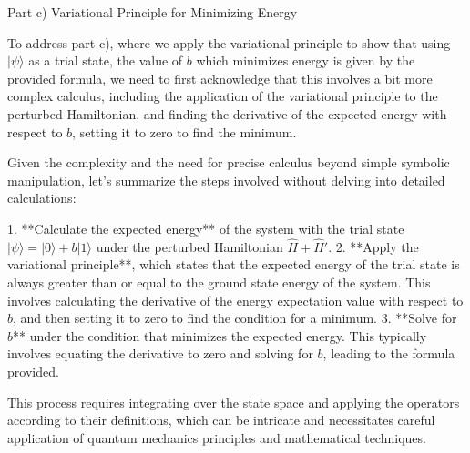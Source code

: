 \documentclass[a4paper,11pt]{article}
\begin{document}
Part c) Variational Principle for Minimizing Energy

To address part c), where we apply the variational principle to show that using \( | \psi \rangle \) as a trial state, the value of \( b \) which minimizes energy is given by the provided formula, we need to first acknowledge that this involves a bit more complex calculus, including the application of the variational principle to the perturbed Hamiltonian, and finding the derivative of the expected energy with respect to \( b \), setting it to zero to find the minimum.

Given the complexity and the need for precise calculus beyond simple symbolic manipulation, let's summarize the steps involved without delving into detailed calculations:

1. **Calculate the expected energy** of the system with the trial state \( | \psi \rangle = | 0 \rangle + b | 1 \rangle \) under the perturbed Hamiltonian \( \hat{H} + \hat{H}' \).
2. **Apply the variational principle**, which states that the expected energy of the trial state is always greater than or equal to the ground state energy of the system. This involves calculating the derivative of the energy expectation value with respect to \( b \), and then setting it to zero to find the condition for a minimum.
3. **Solve for \( b \)** under the condition that minimizes the expected energy. This typically involves equating the derivative to zero and solving for \( b \), leading to the formula provided.

This process requires integrating over the state space and applying the operators according to their definitions, which can be intricate and necessitates careful application of quantum mechanics principles and mathematical techniques.
\end{document}
